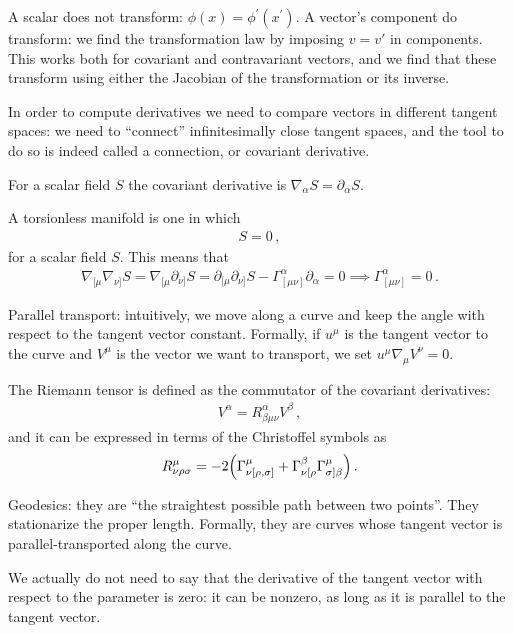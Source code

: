 \documentclass[main.tex]{subfiles}
\begin{document}
A scalar does not transform: \(\phi (x) = \phi^{\prime } (x^{\prime })\).
A vector's component do transform: we find the transformation law by imposing \(v = v'\) in components. 
This works both for covariant and contravariant vectors, and we find that these transform using either the Jacobian of the transformation or its inverse. 

In order to compute derivatives we need to compare vectors in different tangent spaces: we need to ``connect'' infinitesimally close tangent spaces, and the tool to do so is indeed called a connection, or covariant derivative. 

For a scalar field \(S\) the covariant derivative is \(\nabla_{\alpha } S = \partial_{\alpha } S\). 

A torsionless manifold is one in which 
%
\begin{align}
[\nabla_{\mu }, \nabla_{\nu }] S = 0
\,,
\end{align}
%
for a scalar field \(S\). 
This means that 
%
\begin{align}
\nabla_{[\mu  } \nabla_{\nu ]} S = \nabla_{[\mu  } \partial_{\nu ]} S = \partial_{[\mu } \partial_{\nu ]} S - \Gamma^{\alpha }_{[\mu \nu ]} \partial_{\alpha } = 0
\implies \Gamma^{\alpha }_{[\mu \nu ]} = 0
\,.
\end{align}
%


Parallel transport: intuitively, we move along a curve and keep the angle with respect to the tangent vector constant. 
Formally, if \(u^{\mu }\) is the tangent vector to the curve and \(V^{\mu }\) is the vector we want to transport, we set \(u^{\mu } \nabla_{\mu } V^{\nu }= 0\). 

The Riemann tensor is defined as the commutator of the covariant derivatives:
%
\begin{align}
[\nabla_{\mu }, \nabla_{\nu }] V^{\alpha } = R^{\alpha }_{\beta \mu \nu } V^{\beta }
\,,
\end{align}
%
and it can be expressed in terms of the Christoffel symbols as 
%
\begin{align}
R^{\mu }_{\nu \rho \sigma } = -2 \qty(\Gamma^{\mu }_{\nu [\rho , \sigma ]} + \Gamma^{\beta }_{\nu [\rho } \Gamma^{\mu }_{\sigma ] \beta })
\,.
\end{align}

Geodesics: they are ``the straightest possible path between two points''.
They stationarize the proper length.
Formally, they are curves whose tangent vector is parallel-transported along the curve. 

We actually do not need to say that the derivative of the tangent vector with respect to the parameter is zero: it can be nonzero, as long as it is parallel to the tangent vector. 
\end{document}
